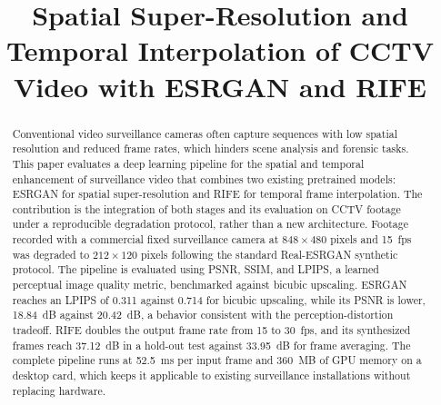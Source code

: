 \documentclass[conference]{IEEEtran}
\begin{document}
\title{Spatial Super-Resolution and Temporal Interpolation of CCTV Video with ESRGAN and RIFE}

\author{
  \and
  \and
}

\maketitle

\begin{abstract}
Conventional video surveillance cameras often capture sequences with low spatial resolution and reduced frame rates, which hinders scene analysis and forensic tasks. This paper evaluates a deep learning pipeline for the spatial and temporal enhancement of surveillance video that combines two existing pretrained models: ESRGAN for spatial super-resolution and RIFE for temporal frame interpolation. The contribution is the integration of both stages and its evaluation on CCTV footage under a reproducible degradation protocol, rather than a new architecture. Footage recorded with a commercial fixed surveillance camera at $848\times480$ pixels and 15~fps was degraded to $212\times120$ pixels following the standard Real-ESRGAN synthetic protocol. The pipeline is evaluated using PSNR, SSIM, and LPIPS, a learned perceptual image quality metric, benchmarked against bicubic upscaling. ESRGAN reaches an LPIPS of 0.311 against 0.714 for bicubic upscaling, while its PSNR is lower, 18.84~dB against 20.42~dB, a behavior consistent with the perception-distortion tradeoff. RIFE doubles the output frame rate from 15 to 30~fps, and its synthesized frames reach 37.12~dB in a hold-out test against 33.95~dB for frame averaging. The complete pipeline runs at 52.5~ms per input frame and 360~MB of GPU memory on a desktop card, which keeps it applicable to existing surveillance installations without replacing hardware.
\end{abstract}
\end{document}

